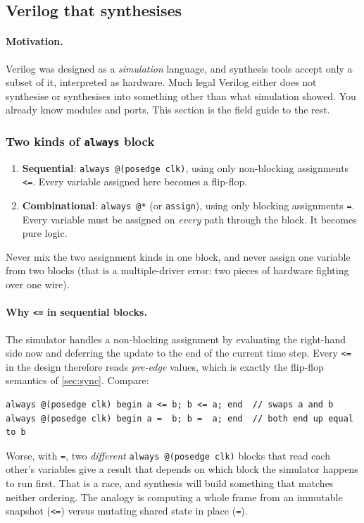 \subsection{Verilog that synthesises}\label{sec:verilog}

\paragraph{Motivation.} Verilog was designed as a \emph{simulation} language,
and synthesis tools accept only a subset of it, interpreted as hardware. Much
legal Verilog either does not synthesise or synthesises into something other
than what simulation showed. You already know modules and ports. This
section is the field guide to the rest.

\subsubsection{Two kinds of \texttt{always} block}

\begin{definition}
\begin{enumerate}[label=(\roman*)]
  \item \textbf{Sequential}: \texttt{always @(posedge clk)}, using only
    non-blocking assignments \texttt{<=}. Every variable assigned here
    becomes a flip-flop.
  \item \textbf{Combinational}: \texttt{always @*} (or \texttt{assign}),
    using only blocking assignments \texttt{=}. Every variable must be
    assigned on \emph{every} path through the block. It becomes pure logic.
\end{enumerate}
Never mix the two assignment kinds in one block, and never assign one
variable from two blocks (that is a multiple-driver error: two pieces of
hardware fighting over one wire).
\end{definition}

\paragraph{Why \texttt{<=} in sequential blocks.} The simulator handles a
non-blocking assignment by evaluating the right-hand side now and deferring
the update to the end of the current time step. Every \texttt{<=} in the
design therefore reads \emph{pre-edge} values, which is exactly the
flip-flop semantics of \cref{sec:sync}. Compare:
\begin{verbatim}
always @(posedge clk) begin a <= b; b <= a; end  // swaps a and b
always @(posedge clk) begin a =  b; b =  a; end  // both end up equal to b
\end{verbatim}
Worse, with \texttt{=}, two \emph{different} \texttt{always @(posedge clk)}
blocks that read each other's variables give a result that depends on which
block the simulator happens to run first. That is a race, and synthesis
will build something that matches neither ordering. The analogy is
computing a whole frame from an immutable snapshot (\texttt{<=}) versus
mutating shared state in place (\texttt{=}).


